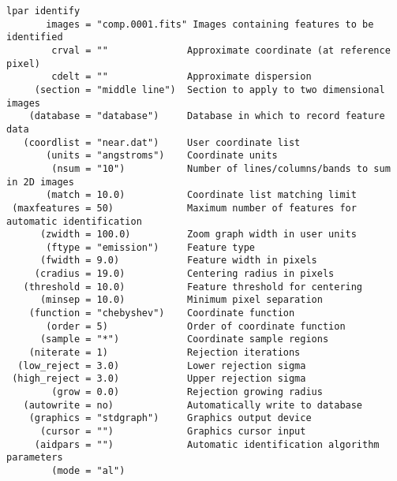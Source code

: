 \begingroup \fontsize{10pt}{10pt}
\selectfont
\begin{verbatim} 
lpar identify
       images = "comp.0001.fits" Images containing features to be identified
        crval = ""              Approximate coordinate (at reference pixel)
        cdelt = ""              Approximate dispersion
     (section = "middle line")  Section to apply to two dimensional images
    (database = "database")     Database in which to record feature data
   (coordlist = "near.dat")     User coordinate list
       (units = "angstroms")    Coordinate units
        (nsum = "10")           Number of lines/columns/bands to sum in 2D images
       (match = 10.0)           Coordinate list matching limit
 (maxfeatures = 50)             Maximum number of features for automatic identification
      (zwidth = 100.0)          Zoom graph width in user units
       (ftype = "emission")     Feature type
      (fwidth = 9.0)            Feature width in pixels
     (cradius = 19.0)           Centering radius in pixels
   (threshold = 10.0)           Feature threshold for centering
      (minsep = 10.0)           Minimum pixel separation
    (function = "chebyshev")    Coordinate function
       (order = 5)              Order of coordinate function
      (sample = "*")            Coordinate sample regions
    (niterate = 1)              Rejection iterations
  (low_reject = 3.0)            Lower rejection sigma
 (high_reject = 3.0)            Upper rejection sigma
        (grow = 0.0)            Rejection growing radius
   (autowrite = no)             Automatically write to database
    (graphics = "stdgraph")     Graphics output device
      (cursor = "")             Graphics cursor input
     (aidpars = "")             Automatic identification algorithm parameters
        (mode = "al")           
\end{verbatim}
\endgroup
